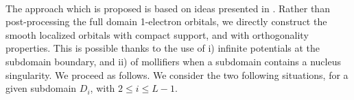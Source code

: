 \documentclass[11pt]{elsarticle}
\let \leq \leqslant
\let \epsilon \varepsilon
\begin{document}
\\
The approach which is proposed is based on ideas presented in \cite{CAM15-09}. Rather than post-processing the full domain 1-electron orbitals, we directly construct the smooth localized orbitals with compact support, and with orthogonality properties. This is possible thanks to the use of i) infinite potentials at the subdomain boundary, and ii) of mollifiers when a subdomain contains a nucleus singularity. We proceed as follows.  We consider the two following situations, for a given subdomain $D_i$, with $2\leq i \leq  L-1$.
\end{document}
